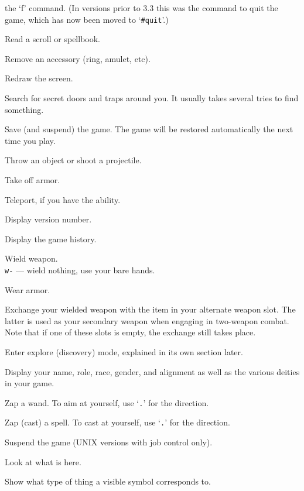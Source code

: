 the `f' command.  (In versions prior to 3.3 this was the command to quit
the game, which has now been moved to `{\tt \#quit}'.)
\item[\tb{r}]
Read a scroll or spellbook.
\item[\tb{R}]
Remove an accessory (ring, amulet, etc).
\item[\tb{\^{}R}]
Redraw the screen.
\item[\tb{s}]
Search for secret doors and traps around you.  It usually takes several
tries to find something.
\item[\tb{S}]
Save (and suspend) the game.  The game will be restored automatically the
next time you play.
\item[\tb{t}]
Throw an object or shoot a projectile.
\item[\tb{T}]
Take off armor.
\item[\tb{\^{}T}]
Teleport, if you have the ability.
\item[\tb{v}]
Display version number.
\item[\tb{V}]
Display the game history.
\item[\tb{w}]
Wield weapon.\\
{\tt w-} --- wield nothing, use your bare hands.
\item[\tb{W}]
Wear armor.
\item[\tb{x}]
Exchange your wielded weapon with the item in your alternate
weapon slot.  The latter is used as your secondary weapon when engaging in
two-weapon combat.  Note that if one of these slots is empty,
the exchange still takes place.
\item[\tb{X}]
Enter explore (discovery) mode, explained in its own section later.
\item[\tb{\^{}X}]
Display your name, role, race, gender, and alignment as well as
the various deities in your game.
\item[\tb{z}]
Zap a wand.  To aim at yourself, use `{\tt .}' for the direction.
\item[\tb{Z}]
Zap (cast) a spell.  To cast at yourself, use `{\tt .}' for the direction.
\item[\tb{\^{}Z}]
Suspend the game (UNIX versions with job control only).
\item[\tb{:}]
Look at what is here.
\item[\tb{;}]
Show what type of thing a visible symbol corresponds to.
\item[\tb{,}]
